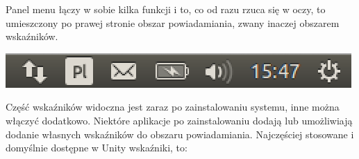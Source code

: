 \textcolor{ubuntu_orange}{Panel menu} łączy w sobie kilka funkcji i to, co od razu rzuca się w oczy, to umieszczony po prawej stronie \textcolor{ubuntu_orange}{obszar powiadamiania}, zwany inaczej obszarem wskaźników.

\begin{center}
	\includegraphics[width=\linewidth]{images/unity_menu_bar.png}
\end{center}

Część wskaźników widoczna jest zaraz po zainstalowaniu systemu, inne można włączyć dodatkowo. Niektóre aplikacje po zainstalowaniu dodają lub umożliwiają dodanie własnych wskaźników do obszaru powiadamiania. Najczęściej stosowane i domyślnie dostępne w Unity wskaźniki, to:
